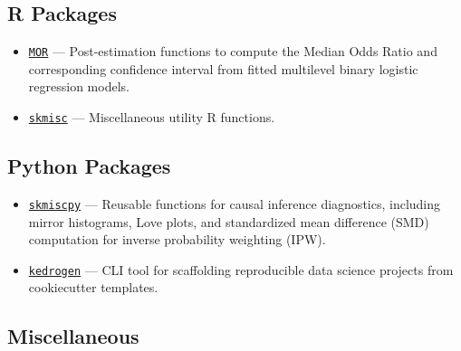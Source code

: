 \documentclass[letterpaper,11pt]{article}
\begin{document}
\subsection*{R Packages}

\begin{itemize}[itemsep=3pt, parsep=0pt, topsep=0pt, leftmargin=*]

  \item \href{https://shafayetshafee.github.io/MOR/}{\texttt{MOR}} --- Post-estimation
  functions to compute the Median Odds Ratio and corresponding confidence interval
  from fitted multilevel binary logistic regression models.

  \item \href{https://shafayetshafee.github.io/skmisc/}{\texttt{skmisc}} --- Miscellaneous
  utility R functions.

\end{itemize}

\subsection*{Python Packages}

\begin{itemize}[itemsep=3pt, parsep=0pt, topsep=0pt, leftmargin=*]

  \item \href{https://skmiscpy.readthedocs.io/en/latest/}{\texttt{skmiscpy}} ---
   Reusable functions for causal inference diagnostics, including mirror histograms,
   Love plots, and standardized mean difference (SMD) computation for inverse
   probability weighting (IPW).

  \item \href{https://github.com/shafayetShafee/kedrogen}{\texttt{kedrogen}} ---
  CLI tool for scaffolding reproducible data science projects from cookiecutter templates.

\end{itemize}


\subsection*{Miscellaneous}
\end{document}

